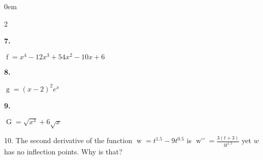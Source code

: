 \documentclass[12pt,]{book}
\theoremstyle{plain}
\theoremstyle{definition}
\numberwithin{equation}{section}
\newenvironment{exercisegroup}%
{\medskip\noindent}%
{\par\bigskip}%
\newlength{\exercisegroupindent}%
\newlength{\exercisegroupitemwidth}%
\newenvironment{exercisegrouplist}%
{\vspace{-\partopsep}%
\begin{adjustwidth}{\exercisegroupindent}{0em}}%
{\end{adjustwidth}%
\vspace{-\partopsep}%
\vspace{\baselineskip}}%
\newenvironment{exercisegroupbycol}[1]%
{\begin{exercisegrouplist}%
\vspace{-\multicolsep}%
\begin{multicols}{#1}%
\setlength{\parindent}{0em}%
\setlength{\exercisegroupitemwidth}{\linewidth}}%
{\end{multicols}%
\vspace{-\multicolsep}%
\end{exercisegrouplist}}%
\newenvironment{exercisegroupitem}[1]%
{\begin{minipage}[t]{\exercisegroupitemwidth}
\vspace{0pt}%
{\bfseries#1}%
\rule{0pt}{\baselineskip}}{\strut%
\end{minipage}%
\hspace{\columnsep}}%
\providecommand\phantomsection{}
\newcommand{\fe}[2]{\mathop{{#1}{\left(#2\right)}}}
\newcommand{\sd}[1]{#1''}
\begin{document}
\begin{exerciselist}
\begin{exercisegroup}
\par
\begin{exercisegroupbycol}{2}%
\begin{exercisegroupitem}{7. }\phantomsection\hypertarget{exercise-make-second-derivative-table-first}{\null}
\(\fe{f}{x}=x^4-12x^3+54x^2-10x+6\)%
\end{exercisegroupitem}%
\par%
\begin{exercisegroupitem}{8. }\phantomsection\hypertarget{exercise-44}{\null}
\(\fe{g}{x}=(x-2)^2e^x\)%
\end{exercisegroupitem}%
\par%
\begin{exercisegroupitem}{9. }\phantomsection\hypertarget{exercise-make-second-derivative-table-last}{\null}
\(\fe{G}{x}=\sqrt{x^3}+6\sqrt{x}\)%
\end{exercisegroupitem}%
\par%
\end{exercisegroupbycol}%
\end{exercisegroup}%
\item[10.]\phantomsection\hypertarget{exercise-46}{\null}The second derivative of the function \(\fe{w}{t}=t^{1.5}-9t^{0.5}\) is \(\fe{\sd{w}}{t}=\frac{3(t+3)}{4t^{1.5}}\) yet \(w\) has no inflection points. Why is that?%
\par\smallskip
\end{exerciselist}
\typeout{************************************************}
\typeout{************************************************}
\end{document}
